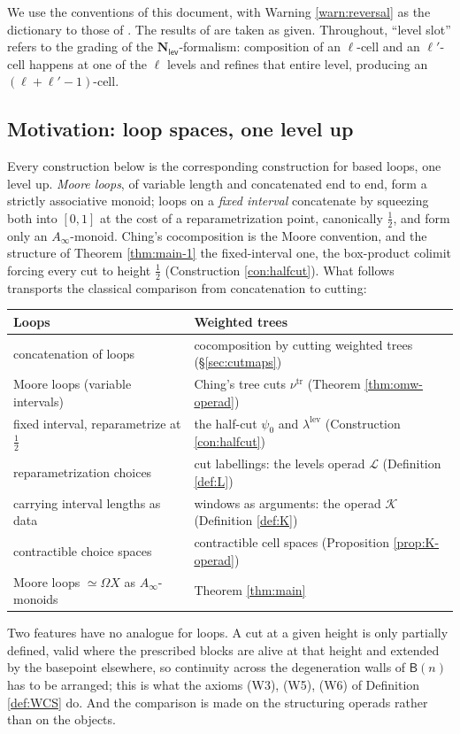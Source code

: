 \documentclass[12pt]{amsart}
\theoremstyle{definition}
\theoremstyle{remark}
\newcommand{\Nl}{\mathbf{N}_{\mathsf{lev}}}
\newcommand{\BC}{\mathsf{B}}                     %
\newcommand{\Kop}{\mathcal{K}}                   %
\newcommand{\Lop}{\mathcal{L}}                   %
\begin{document}
We use the conventions of this document, with Warning \ref{warn:reversal} as the dictionary to those of \cite{Ching-thesis}. The results of \cite{Ching-thesis} are taken as given. Throughout, ``level slot'' refers to the grading of the $\Nl$-formalism: composition of an $\ell$-cell and an $\ell'$-cell happens at one of the $\ell$ levels and refines that entire level, producing an $(\ell+\ell'-1)$-cell.

\subsection{Motivation: loop spaces, one level up}\label{sec:loop-analogy}
Every construction below is the corresponding construction for based loops, one level up. \emph{Moore loops}, of variable length and concatenated end to end, form a strictly associative monoid; loops on a \emph{fixed interval} concatenate by squeezing both into $[0,1]$ at the cost of a reparametrization point, canonically $\tfrac12$, and form only an $A_\infty$-monoid. Ching's cocomposition is the Moore convention, and the structure of Theorem \ref{thm:main-1} the fixed-interval one, the box-product colimit forcing every cut to height $\tfrac12$ (Construction \ref{con:halfcut}). What follows transports the classical comparison from concatenation to cutting:
\begin{center}
\renewcommand{\arraystretch}{1.3}
\begin{tabular}{|p{}|p{}|}
\hline
\textbf{Loops} & \textbf{Weighted trees} \\
\hline
concatenation of loops & cocomposition by cutting weighted trees (\S\ref{sec:cutmaps}) \\
\hline
Moore loops (variable intervals) & Ching's tree cuts $\nu^{\mathrm{tr}}$ (Theorem \ref{thm:omw-operad}) \\
\hline
fixed interval, reparametrize at $\tfrac12$ & the half-cut $\psi_0$ and $\lambda^{\mathrm{lev}}$ (Construction \ref{con:halfcut}) \\
\hline
reparametrization choices & cut labellings: the levels operad $\Lop$ (Definition \ref{def:L}) \\
\hline
carrying interval lengths as data & windows as arguments: the operad $\Kop$ (Definition \ref{def:K}) \\
\hline
contractible choice spaces & contractible cell spaces (Proposition \ref{prop:K-operad}) \\
\hline
Moore loops $\simeq \Omega X$ as $A_\infty$-monoids & Theorem \ref{thm:main} \\
\hline
\end{tabular}
\end{center}
Two features have no analogue for loops. A cut at a given height is only partially defined, valid where the prescribed blocks are alive at that height and extended by the basepoint elsewhere, so continuity across the degeneration walls of $\BC(n)$ has to be arranged; this is what the axioms (W3), (W5), (W6) of Definition \ref{def:WCS} do. And the comparison is made on the structuring operads rather than on the objects.
\end{document}
